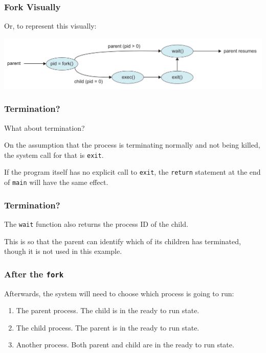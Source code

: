 \begin{frame}
	\frametitle{Fork Visually}

	Or, to represent this visually:

	\begin{center}
		\includegraphics[width=\textwidth]{images/fork-syscall.png}
	\end{center}

\end{frame}

\begin{frame}
	\frametitle{Termination?}

	What about termination?

	On the assumption that the process is terminating normally and not being killed, the system call for that is \texttt{exit}.

	If the program itself has no explicit call to \texttt{exit}, the \texttt{return} statement at the end of \texttt{main} will have the same effect.

\end{frame}

\begin{frame}
	\frametitle{Termination?}

	The \texttt{wait} function also returns the process ID of the child.

	This is so that the parent can identify which of its children has terminated, though it is not used in this example.

\end{frame}

\begin{frame}
	\frametitle{After the \texttt{fork}}

	Afterwards, the system will need to choose which process is going to run:

	\begin{enumerate}
		\item The parent process. The child is in the ready to run state.
		\item The child process. The parent is in the ready to run state.
		\item Another process. Both parent and child are in the ready to run state.
	\end{enumerate}

\end{frame}


